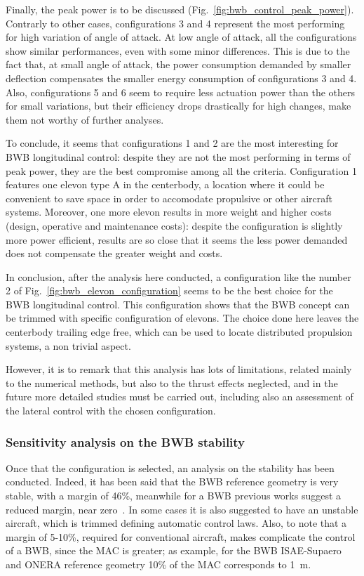 Finally, the peak power is to be discussed (Fig.~\ref{fig:bwb_control_peak_power}). 
Contrarly to other cases, configurations 3 and 4 represent the most performing for high variation of angle of attack. 
At low angle of attack, all the configurations show similar performances, even with some minor differences. 
This is due to the fact that, at small angle of attack, the power consumption demanded by smaller deflection compensates the smaller energy consumption of configurations 3 and 4. 
Also, configurations 5 and 6 seem to require less actuation power than the others for small variations, but their efficiency drops drastically for high changes, make them not worthy of further analyses. 

To conclude, it seems that configurations 1 and 2 are the most interesting for BWB longitudinal control: despite they are not the most performing in terms of peak power, they are the best compromise among all the criteria. 
Configuration 1 features one elevon type A in the centerbody, a location where it could be convenient to save space in order to accomodate propulsive or other aircraft systems. 
Moreover, one more elevon results in more weight and higher costs (design, operative and maintenance costs): despite the configuration is slightly more power efficient, results are so close that it seems the less power demanded does not compensate the greater weight and costs. 

In conclusion, after the analysis here conducted, a configuration like the number 2 of Fig.~\ref{fig:bwb_elevon_configuration} seems to be the best choice for the BWB longitudinal control. 
This configuration shows that the BWB concept can be trimmed with specific configuration of elevons. 
The choice done here leaves the centerbody trailing edge free, which can be used to locate distributed propulsion systems, a non trivial aspect. 

However, it is to remark that this analysis has lots of limitations, related mainly to the numerical methods, but also to the thrust effects neglected, and in the future more detailed studies must be carried out, including also an assessment of the lateral control with the chosen configuration. 

\subsubsection{Sensitivity analysis on the BWB stability}
\label{subsubsec:chap4_bwb_sensitivity_sm}

Once that the configuration is selected, an analysis on the stability has been conducted. 
Indeed, it has been said that the BWB reference geometry is very stable, with a margin of 46\%, meanwhile for a BWB previous works suggest a reduced margin, near zero~\cite{bib:nickel, bib:ashkenas, bib:wang}.
In some cases it is also suggested to have an unstable aircraft, which is trimmed defining automatic control laws. 
Also, to note that a margin of 5-10\%, required for conventional aircraft, makes complicate the control of a BWB, since the MAC is greater; as example, for the BWB ISAE-Supaero and ONERA reference geometry 10\% of the MAC corresponds to 1~\si{\meter}. 

